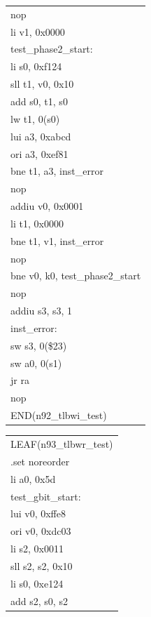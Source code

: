 \documentclass[11pt,utf8]{article}
\begin{document}
{{{\begin{center}
\begin{longtable}{p{15cm}}
{ }{ }{ }{ }nop\\
{ }{ }{ }{ }li{ }v1,{ }0x0000\\
test\_phase2\_start:\\
{ }{ }{ }{ }li{ }s0,{ }0xf124\\
{ }{ }{ }{ }sll{ }t1,{ }v0,{ }0x10\\
{ }{ }{ }{ }add{ }s0,{ }t1,{ }s0\\
{ }{ }{ }{ }lw{ }t1,{ }0(s0)\\
{ }{ }{ }{ }lui{ }a3,{ }0xabcd\\
{ }{ }{ }{ }ori{ }a3,{ }0xef81\\
{ }{ }{ }{ }bne{ }t1,{ }a3,{ }inst\_error\\
{ }{ }{ }{ }nop\\
{ }{ }{ }{ }addiu{ }v0,{ }0x0001\\
{ }{ }{ }{ }li{ }t1,{ }0x0000\\
{ }{ }{ }{ }bne{ }t1,{ }v1,{ }inst\_error\\
{ }{ }{ }{ }nop\\
{ }{ }{ }{ }bne{ }v0,{ }k0,{ }test\_phase2\_start\\
{ }{ }{ }{ }nop\\
{ }{ }{ }{ }addiu{ }s3,{ }s3,{ }1\\
inst\_error:{ }{ }\\
{ }{ }{ }{ }sw{ }s3,{ }0(\$23)\\
{ }{ }{ }{ }sw{ }a0,{ }0(s1)\\
{ }{ }{ }{ }jr{ }ra\\
{ }{ }{ }{ }nop\\
END(n92\_tlbwi\_test)\\
		\hline  
	\end{longtable}  
\end{center}
\begin{center}
	\begin{longtable}{p{15cm}}
		\hline 
LEAF(n93\_tlbwr\_test)\\
{ }{ }{ }{ }.set{ }noreorder\\
{ }{ }{ }{ }li{ }{ }a0,{ }0x5d\\
test\_gbit\_start:\\
{ }{ }{ }{ }lui{ }v0,{ }0xffe8\\
{ }{ }{ }{ }ori{ }v0,{ }0xdc03\\
{ }{ }{ }{ }li{ }s2,{ }0x0011\\
{ }{ }{ }{ }sll{ }s2,{ }s2,{ }0x10\\
{ }{ }{ }{ }li{ }s0,{ }0xe124\\
{ }{ }{ }{ }add{ }s2,{ }s0,{ }s2\\

\end{longtable}
\end{center}}}}
\end{document}
